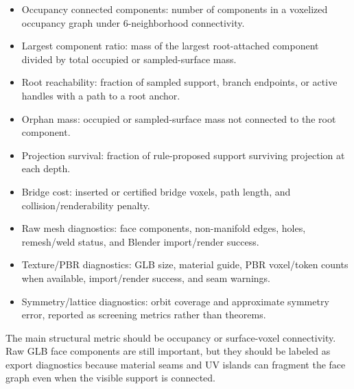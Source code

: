 \begin{itemize}
  \item Occupancy connected components: number of components in a voxelized
  occupancy graph under 6-neighborhood connectivity.
  \item Largest component ratio: mass of the largest root-attached component
  divided by total occupied or sampled-surface mass.
  \item Root reachability: fraction of sampled support, branch endpoints, or
  active handles with a path to a root anchor.
  \item Orphan mass: occupied or sampled-surface mass not connected to the root
  component.
  \item Projection survival: fraction of rule-proposed support surviving
  projection at each depth.
  \item Bridge cost: inserted or certified bridge voxels, path length, and
  collision/renderability penalty.
  \item Raw mesh diagnostics: face components, non-manifold edges, holes,
  remesh/weld status, and Blender import/render success.
  \item Texture/PBR diagnostics: GLB size, material guide, PBR voxel/token
  counts when available, import/render success, and seam warnings.
  \item Symmetry/lattice diagnostics: orbit coverage and approximate symmetry
  error, reported as screening metrics rather than theorems.
\end{itemize}

The main structural metric should be occupancy or surface-voxel connectivity.
Raw GLB face components are still important, but they should be labeled as
export diagnostics because material seams and UV islands can fragment the face
graph even when the visible support is connected.

